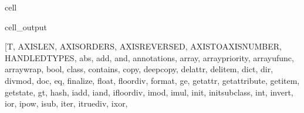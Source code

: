 \documentclass[letterpaper,10pt,english]{jupyterBook}
\begin{document}
\begin{sphinxuseclass}{cell}
\begin{sphinxVerbatimOutput}
\begin{sphinxuseclass}{cell_output}
\begin{sphinxVerbatim}[commandchars=\\\{\}]
[\PYGZsq{}T\PYGZsq{}, \PYGZsq{}\PYGZus{}AXIS\PYGZus{}LEN\PYGZsq{}, \PYGZsq{}\PYGZus{}AXIS\PYGZus{}ORDERS\PYGZsq{}, \PYGZsq{}\PYGZus{}AXIS\PYGZus{}REVERSED\PYGZsq{}, \PYGZsq{}\PYGZus{}AXIS\PYGZus{}TO\PYGZus{}AXIS\PYGZus{}NUMBER\PYGZsq{}, \PYGZsq{}\PYGZus{}HANDLED\PYGZus{}TYPES\PYGZsq{}, \PYGZsq{}\PYGZus{}\PYGZus{}abs\PYGZus{}\PYGZus{}\PYGZsq{}, \PYGZsq{}\PYGZus{}\PYGZus{}add\PYGZus{}\PYGZus{}\PYGZsq{}, \PYGZsq{}\PYGZus{}\PYGZus{}and\PYGZus{}\PYGZus{}\PYGZsq{}, \PYGZsq{}\PYGZus{}\PYGZus{}annotations\PYGZus{}\PYGZus{}\PYGZsq{}, \PYGZsq{}\PYGZus{}\PYGZus{}array\PYGZus{}\PYGZus{}\PYGZsq{}, \PYGZsq{}\PYGZus{}\PYGZus{}array\PYGZus{}priority\PYGZus{}\PYGZus{}\PYGZsq{}, \PYGZsq{}\PYGZus{}\PYGZus{}array\PYGZus{}ufunc\PYGZus{}\PYGZus{}\PYGZsq{}, \PYGZsq{}\PYGZus{}\PYGZus{}array\PYGZus{}wrap\PYGZus{}\PYGZus{}\PYGZsq{}, \PYGZsq{}\PYGZus{}\PYGZus{}bool\PYGZus{}\PYGZus{}\PYGZsq{}, \PYGZsq{}\PYGZus{}\PYGZus{}class\PYGZus{}\PYGZus{}\PYGZsq{}, \PYGZsq{}\PYGZus{}\PYGZus{}contains\PYGZus{}\PYGZus{}\PYGZsq{}, \PYGZsq{}\PYGZus{}\PYGZus{}copy\PYGZus{}\PYGZus{}\PYGZsq{}, \PYGZsq{}\PYGZus{}\PYGZus{}deepcopy\PYGZus{}\PYGZus{}\PYGZsq{}, \PYGZsq{}\PYGZus{}\PYGZus{}delattr\PYGZus{}\PYGZus{}\PYGZsq{}, \PYGZsq{}\PYGZus{}\PYGZus{}delitem\PYGZus{}\PYGZus{}\PYGZsq{}, \PYGZsq{}\PYGZus{}\PYGZus{}dict\PYGZus{}\PYGZus{}\PYGZsq{}, \PYGZsq{}\PYGZus{}\PYGZus{}dir\PYGZus{}\PYGZus{}\PYGZsq{}, \PYGZsq{}\PYGZus{}\PYGZus{}divmod\PYGZus{}\PYGZus{}\PYGZsq{}, \PYGZsq{}\PYGZus{}\PYGZus{}doc\PYGZus{}\PYGZus{}\PYGZsq{}, \PYGZsq{}\PYGZus{}\PYGZus{}eq\PYGZus{}\PYGZus{}\PYGZsq{}, \PYGZsq{}\PYGZus{}\PYGZus{}finalize\PYGZus{}\PYGZus{}\PYGZsq{}, \PYGZsq{}\PYGZus{}\PYGZus{}float\PYGZus{}\PYGZus{}\PYGZsq{}, \PYGZsq{}\PYGZus{}\PYGZus{}floordiv\PYGZus{}\PYGZus{}\PYGZsq{}, \PYGZsq{}\PYGZus{}\PYGZus{}format\PYGZus{}\PYGZus{}\PYGZsq{}, \PYGZsq{}\PYGZus{}\PYGZus{}ge\PYGZus{}\PYGZus{}\PYGZsq{}, \PYGZsq{}\PYGZus{}\PYGZus{}getattr\PYGZus{}\PYGZus{}\PYGZsq{}, \PYGZsq{}\PYGZus{}\PYGZus{}getattribute\PYGZus{}\PYGZus{}\PYGZsq{}, \PYGZsq{}\PYGZus{}\PYGZus{}getitem\PYGZus{}\PYGZus{}\PYGZsq{}, \PYGZsq{}\PYGZus{}\PYGZus{}getstate\PYGZus{}\PYGZus{}\PYGZsq{}, \PYGZsq{}\PYGZus{}\PYGZus{}gt\PYGZus{}\PYGZus{}\PYGZsq{}, \PYGZsq{}\PYGZus{}\PYGZus{}hash\PYGZus{}\PYGZus{}\PYGZsq{}, \PYGZsq{}\PYGZus{}\PYGZus{}iadd\PYGZus{}\PYGZus{}\PYGZsq{}, \PYGZsq{}\PYGZus{}\PYGZus{}iand\PYGZus{}\PYGZus{}\PYGZsq{}, \PYGZsq{}\PYGZus{}\PYGZus{}ifloordiv\PYGZus{}\PYGZus{}\PYGZsq{}, \PYGZsq{}\PYGZus{}\PYGZus{}imod\PYGZus{}\PYGZus{}\PYGZsq{}, \PYGZsq{}\PYGZus{}\PYGZus{}imul\PYGZus{}\PYGZus{}\PYGZsq{}, \PYGZsq{}\PYGZus{}\PYGZus{}init\PYGZus{}\PYGZus{}\PYGZsq{}, \PYGZsq{}\PYGZus{}\PYGZus{}init\PYGZus{}subclass\PYGZus{}\PYGZus{}\PYGZsq{}, \PYGZsq{}\PYGZus{}\PYGZus{}int\PYGZus{}\PYGZus{}\PYGZsq{}, \PYGZsq{}\PYGZus{}\PYGZus{}invert\PYGZus{}\PYGZus{}\PYGZsq{}, \PYGZsq{}\PYGZus{}\PYGZus{}ior\PYGZus{}\PYGZus{}\PYGZsq{}, \PYGZsq{}\PYGZus{}\PYGZus{}ipow\PYGZus{}\PYGZus{}\PYGZsq{}, \PYGZsq{}\PYGZus{}\PYGZus{}isub\PYGZus{}\PYGZus{}\PYGZsq{}, \PYGZsq{}\PYGZus{}\PYGZus{}iter\PYGZus{}\PYGZus{}\PYGZsq{}, \PYGZsq{}\PYGZus{}\PYGZus{}itruediv\PYGZus{}\PYGZus{}\PYGZsq{}, \PYGZsq{}\PYGZus{}\PYGZus{}ixor\PYGZus{}\PYGZus{}\PYGZsq{}, 
\end{sphinxVerbatim}
\end{sphinxuseclass}
\end{sphinxVerbatimOutput}
\end{sphinxuseclass}
\end{document}
